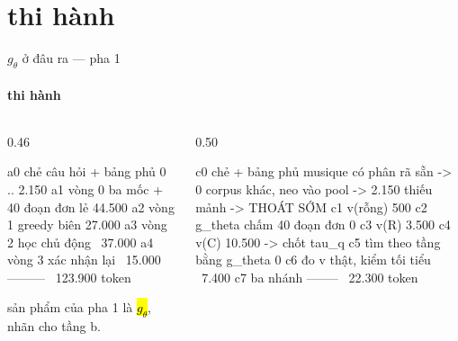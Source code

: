 \section{thi hành}

\begin{frame}[fragile]{$g_\theta$ ở đâu ra — pha 1}
  \framesubtitle{thi hành}

  \begin{columns}[t]
  \begin{column}{0.46\textwidth}
    \begin{bx}[title={pha 1 · $10{,}000$ truy vấn · llm đầy đủ}]
      \begin{dia}
a0  chẻ câu hỏi + bảng phủ  0 .. 2.150
a1  vòng 0  ba mốc + 40 đoạn
            đơn lẻ            44.500
a2  vòng 1  greedy biên       27.000
a3  vòng 2  học chủ động     ~37.000
a4  vòng 3  xác nhận lại     ~15.000
                            ---------
                            ~123.900 token
      \end{dia}
      \vspace{0.25em}
      sản phẩm của pha 1 là \hl{$g_\theta$},  nhãn cho tầng b.
    \end{bx}
  \end{column}
  \begin{column}{0.50\textwidth}
    \begin{bx}[title={pha 2 · $200{,}000$ truy vấn · đường rẻ}]
      \begin{dia}
c0  chẻ + bảng phủ
      musique có phân rã sẵn ->     0
      corpus khác, neo vào pool -> 2.150
      thiếu mảnh -> THOÁT SỚM
c1  v(rỗng)                      500
c2  g_theta chấm 40 đoạn đơn       0
c3  v(R)                       3.500
c4  v(C)                      10.500
      -> chốt tau_q
c5  tìm theo tầng bằng g_theta     0
c6  đo v thật, kiểm tối tiểu  ~7.400
c7  ba nhánh
                              --------
                               ~22.300 token
      \end{dia}
      \vspace{0.25em}
    \end{bx}
  \end{column}
  \end{columns}
\end{frame}

